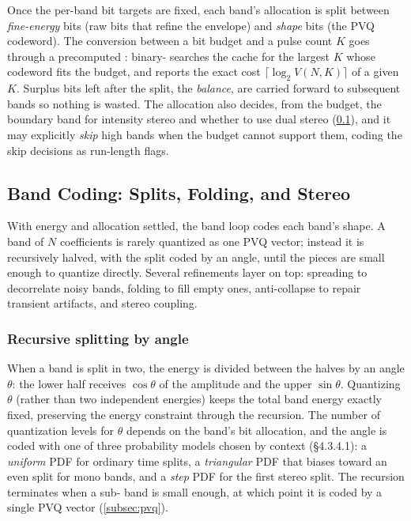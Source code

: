 Once the per-band bit targets are fixed, each band's allocation is split between
\emph{fine-energy} bits (raw bits that refine the envelope) and \emph{shape}
bits (the PVQ codeword). The conversion between a bit budget and a pulse count
$K$ goes through a precomputed :  binary-
searches the cache for the largest $K$ whose codeword fits the budget, and
 reports the exact cost $\lceil\log_2 V(N,K)\rceil$ of a given
$K$. Surplus bits left after the split, the \emph{balance}, are carried forward
to subsequent bands so nothing is wasted. The allocation also decides, from the
budget, the boundary band for intensity stereo and whether to use dual stereo
(\cref{subsec:celt_bands}), and it may explicitly \emph{skip} high
bands when the
budget cannot support them, coding the skip decisions as run-length flags.

\subsection{Band Coding: Splits, Folding, and Stereo}\label{subsec:celt_bands}

With energy and allocation settled, the band loop codes each band's shape. A
band of $N$ coefficients is rarely quantized as one PVQ vector; instead it is
recursively halved, with the split coded by an angle, until the pieces are small
enough to quantize directly. Several refinements layer on top: spreading to
decorrelate noisy bands, folding to fill empty ones, anti-collapse to repair
transient artifacts, and stereo coupling.

\subsubsection{Recursive splitting by angle}

When a band is split in two, the energy is divided between the halves
by an angle
$\theta$: the lower half receives $\cos\theta$ of the amplitude and the upper
$\sin\theta$. Quantizing $\theta$ (rather than two independent energies) keeps
the total band energy exactly fixed, preserving the energy constraint
through the
recursion. The number of quantization levels for $\theta$ depends on the band's
bit allocation, and the angle is coded with one of three probability models
chosen by context (\S4.3.4.1): a \emph{uniform} PDF for ordinary time splits, a
\emph{triangular} PDF that biases toward an even split for mono bands, and a
\emph{step} PDF for the first stereo split. The recursion terminates when a sub-
band is small enough, at which point it is coded by a single PVQ vector
(\cref{subsec:pvq}).

